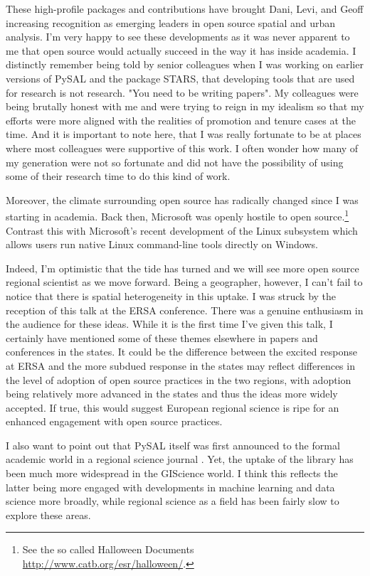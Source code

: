 \documentclass[11pt]{article}
\begin{document}
These high-profile packages and contributions have brought Dani, Levi, and
Geoff increasing recognition as emerging leaders in open source spatial and
urban analysis. I'm very happy to see these developments as it was never
apparent to me that open source would actually succeed in the way it has inside
academia. I distinctly remember being told by senior colleagues when I was
working on earlier versions of PySAL and the package STARS, that developing
tools that are used for research is not research. "You need to be writing
papers". My colleagues were being brutally honest with me and were trying to
reign in my idealism so that my efforts were more aligned with the realities of
promotion and tenure cases at the time. And it is important to note here, that
I was really fortunate to be at places where most colleagues were supportive of
this work. I often wonder how many of my generation were not so fortunate and
did not have the possibility of using some of their research time to do this
kind of work.

Moreover, the climate surrounding open source has radically changed since I was
starting in academia. Back then, Microsoft was openly hostile to open
source.\footnote{See the so called Halloween Documents \url{http://www.catb.org/esr/halloween/}.} Contrast this with Microsoft's recent development of the
Linux subsystem which allows users run native Linux command-line tools directly
on Windows.


Indeed, I'm optimistic that the tide has turned and we will see more open
source regional scientist as we move forward. Being a geographer, however, I
can't fail to notice that there is spatial heterogeneity in this uptake. I was
struck by the reception of this talk at the ERSA conference. There was a
genuine enthusiasm in the audience for these ideas. While it is the first time
I've given this talk, I certainly have mentioned some of these themes elsewhere
in papers \citep{Rey17_codeastext,rey_open_2014,Rey_2009} and conferences in the
states. It could be the difference between the excited response at ERSA
and the more subdued response in the states may reflect differences in the
level of adoption of open source practices in the two regions, with adoption
being relatively more advanced in the states and thus the ideas more widely
accepted. If true, this would suggest European regional science is ripe for an
enhanced engagement with open source practices.

I also want to point out that PySAL itself was first announced to the formal
academic world in a regional science journal \citep{rey_pysal:_2007-3}. Yet,
the uptake of the library has been much more widespread in the GIScience world.
I think this reflects the latter being more engaged with developments in
machine learning and data science more broadly, while regional science as a
field has been fairly slow to explore these areas.
\end{document}
